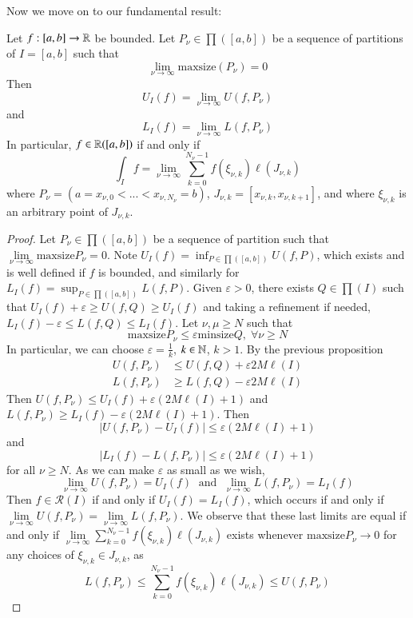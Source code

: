 Now we move on to our fundamental result:

\begin{namthm}
    Let $f:[a,b]\rightarrow \mathbb R$ be bounded. Let $P_{\nu} \in \prod([a,b])$ be a sequence of partitions of $I=[a,b]$ such that $$\lim\limits_{\nu\rightarrow \infty}\text{maxsize}(P_{\nu}) = 0$$ Then $$U_I(f) = \lim\limits_{\nu\rightarrow \infty}U(f,P_{\nu})$$ and $$L_I(f) = \lim\limits_{\nu\rightarrow \infty}L(f,P_{\nu})$$ In particular, $f \in \mathbb R([a,b])$ if and only if $$\int_If = \lim\limits_{\nu\rightarrow \infty}\sum_{k=0}^{N_{\nu}-1}f(\xi_{\nu,k})\ell(J_{\nu,k})$$ where $P_{\nu} = (a=x_{\nu,0} < ... < x_{\nu,N_{\nu}}=b)$, $J_{\nu,k} = [x_{\nu,k},x_{\nu,k+1}]$, and where $\xi_{\nu,k}$ is an arbitrary point of $J_{\nu,k}$.
\end{namthm}
\begin{proof}
    Let $P_{\nu} \in \prod([a,b])$ be a sequence of partition such that $\lim\limits_{\nu\rightarrow \infty}\text{maxsize}P_{\nu} = 0$. Note $U_I(f) = \inf_{P\in\prod([a,b])}U(f,P)$, which exists and is well defined if $f$ is bounded, and similarly for $L_I(f) = \sup_{P \in \prod([a,b])}L(f,P)$. Given $\varepsilon > 0$, there exists $Q \in \prod(I)$ such that $U_I(f) + \varepsilon \geq U(f,Q) \geq U_I(f)$ and taking a refinement if needed, $L_I(f) - \varepsilon \leq L(f,Q) \leq L_I(f)$. Let $\nu,\mu \geq N$ such that $$\text{maxsize}P_{\nu} \leq \varepsilon\text{minsize}Q,\;\forall\nu\geq N$$ In particular, we can choose $\varepsilon = \frac{1}{k}$, $k \in \mathbb N$, $k > 1$. By the previous proposition \begin{align*}
        U(f,P_{\nu}) &\leq U(f,Q) + \varepsilon 2M\ell(I) \\
        L(f,P_{\nu}) &\geq L(f,Q) - \varepsilon 2M\ell(I)
    \end{align*}
    Then $U(f,P_{\nu}) \leq U_I(f) + \varepsilon(2M\ell(I)+1)$ and $L(f,P_{\nu}) \geq L_I(f) - \varepsilon(2M\ell(I)+1)$. Then $$|U(f,P_{\nu}) - U_I(f)| \leq \varepsilon(2M\ell(I)+1)$$ and $$|L_I(f) - L(f,P_{\nu})| \leq \varepsilon(2M\ell(I)+1)$$ for all $\nu \geq N$. As we can make $\varepsilon$ as small as we wish, $$\lim\limits_{\nu\rightarrow \infty}U(f,P_{\nu}) = U_I(f)\;\text{ and }\;\lim\limits_{\nu\rightarrow \infty}L(f,P_{\nu}) = L_I(f)$$ Then $f \in \mathcal{R}(I)$ if and only if $U_I(f) = L_I(f)$, which occurs if and only if $\lim\limits_{\nu\rightarrow \infty}U(f,P_{\nu}) = \lim\limits_{\nu\rightarrow \infty}L(f,P_{\nu})$. We observe that these last limits are equal if and only if $\lim\limits_{\nu\rightarrow \infty}\sum_{k=0}^{N_{\nu}-1}f(\xi_{\nu,k})\ell(J_{\nu,k})$ exists whenever $\text{maxsize}P_{\nu}\rightarrow 0$ for any choices of $\xi_{\nu,k} \in J_{\nu,k}$, as \begin{equation*}
        L(f,P_{\nu}) \leq \sum_{k=0}^{N_{\nu}-1}f(\xi_{\nu,k})\ell(J_{\nu,k}) \leq U(f,P_{\nu})
    \end{equation*}
\end{proof}



